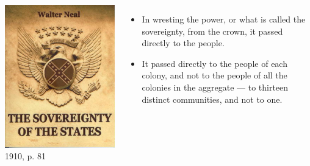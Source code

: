 \begin{frame}
    \begin{columns}[onlytextwidth]
            \centering
            \includegraphics[height=0.75\textheight]{img/walter-neal-book.png} \\
            1910,  p. 81\\

            \begin{itemize}
                \item In wresting the power, or what is called the sovereignty, from the crown, it passed directly to the people.
                \item It passed directly to the people of each colony, and not to the people of all the colonies in the aggregate --- to thirteen distinct communities, and not to one.
            \end{itemize}
    \end{columns}
\end{frame}

